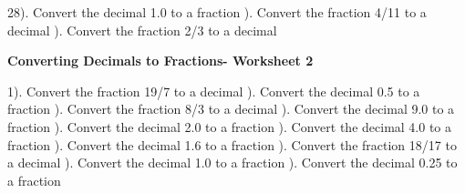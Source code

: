 \documentclass{article}%
\begin{document}
28). Convert the decimal 1.0 to a fraction%
\newline%
\newline%
). Convert the fraction 4/11 to a decimal%
\newline%
\newline%
). Convert the fraction 2/3 to a decimal%
\newline%
\newline%
\newline%
\pagebreak%
\large%
\begin{center}%
\textbf{Converting Decimals to Fractions- Worksheet 2}%
\newline%
\end{center} \normalsize%
1). Convert the fraction 19/7 to a decimal%
\newline%
\newline%
). Convert the decimal 0.5 to a fraction%
\newline%
\newline%
). Convert the fraction 8/3 to a decimal%
\newline%
\newline%
). Convert the decimal 9.0 to a fraction%
\newline%
\newline%
). Convert the decimal 2.0 to a fraction%
\newline%
\newline%
). Convert the decimal 4.0 to a fraction%
\newline%
\newline%
). Convert the decimal 1.6 to a fraction%
\newline%
\newline%
). Convert the fraction 18/17 to a decimal%
\newline%
\newline%
). Convert the decimal 1.0 to a fraction%
\newline%
\newline%
). Convert the decimal 0.25 to a fraction%
\end{document}
